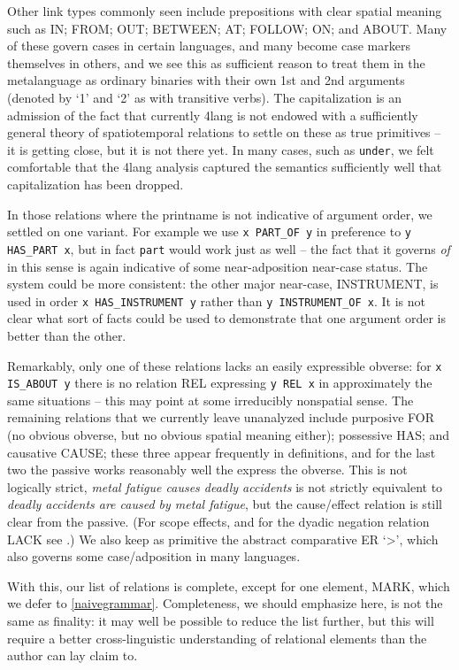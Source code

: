 \documentclass[11pt,bookmarks,bookmarksnumbered,naturalnames,plainpages=false,pdftex,colorlinks=true,urlcolor=blue,bookmarksdepth=subsection,plainpages=false]{paper}
\begin{document}
Other link types commonly seen include prepositions with clear spatial meaning
such as IN; FROM; OUT; BETWEEN; AT; FOLLOW; ON; and ABOUT. Many of these
govern cases in certain languages, and many become case markers themselves in
others, and we see this as sufficient reason to treat them in the metalanguage
as ordinary binaries with their own 1st and 2nd arguments (denoted by `1' and
`2' as with transitive verbs). The capitalization is an admission of the fact
that currently 4lang is not endowed with a sufficiently general theory of
spatiotemporal relations to settle on these as true primitives -- it is
getting close, but it is not there yet. In many cases, such as {\tt under}, we
felt comfortable that the 4lang analysis captured the semantics sufficiently
well that capitalization has been dropped.

In those relations where the printname is not indicative of argument order, we
settled on one variant. For example we use {\tt x PART\_OF y} in preference to
{\tt y HAS\_PART x}, but in fact {\tt part} would work just as well -- the
fact that it governs {\it of} in this sense is again indicative of some
near-adposition near-case status. The system could be more consistent: the
other major near-case, INSTRUMENT, is used in order {\tt x HAS\_INSTRUMENT y}
rather than {\tt y INSTRUMENT\_OF x}. It is not clear what sort of facts could
be used to demonstrate that one argument order is better than the other.

Remarkably, only one of these relations lacks an easily expressible obverse:
for {\tt x IS\_ABOUT y} there is no relation REL expressing {\tt y REL x} in
approximately the same situations -- this may point at some irreducibly
nonspatial sense. The remaining relations that we currently leave unanalyzed
include purposive FOR (no obvious obverse, but no obvious spatial meaning
either); possessive HAS; and causative CAUSE; these three appear frequently in
definitions, and for the last two the passive works reasonably well the
express the obverse. This is not logically strict, {\it metal fatigue causes
  deadly accidents} is not strictly equivalent to {\it deadly accidents are
  caused by metal fatigue}, but the cause/effect relation is still clear from
the passive. (For scope effects, and for the dyadic negation relation LACK see
\cite{Kornai:2020a}.) We also keep as primitive the abstract comparative ER
`>', which also governs some case/adposition in many languages.

With this, our list of relations is complete, except for one element, MARK,
which we defer to \ref{naivegrammar}. Completeness, we should emphasize here,
is not the same as finality: it may well be possible to reduce the list
further, but this will require a better cross-linguistic understanding of
relational elements than the author can lay claim to. 
\end{document}
